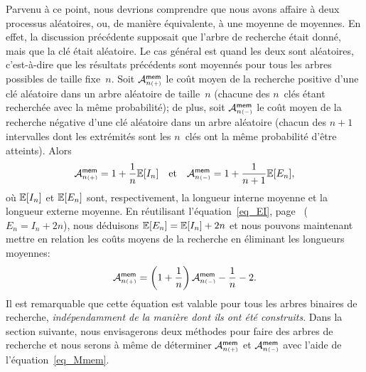Parvenu à ce point, nous devrions comprendre que nous avons affaire à
deux processus aléatoires, ou, de manière équivalente, à une moyenne
de moyennes. En effet, la discussion précédente supposait que l'arbre
de recherche était donné, mais que la clé était aléatoire. Le cas
général est quand les deux sont aléatoires, c'est-à-dire que les
résultats précédents sont moyennés pour tous les arbres possibles de
taille fixe~\(n\). Soit \(\M{\fun{mem}}{n{\scriptscriptstyle (+)}}\)
 le coût moyen
de la recherche positive d'une clé aléatoire dans un arbre aléatoire de
taille~\(n\) (chacune des \(n\)~clés étant recherchée avec la même
probabilité); de plus, soit \(\M{\fun{mem}}{n{\scriptscriptstyle
    (-)}}\) le
coût moyen de la recherche négative d'une clé aléatoire dans un arbre
aléatoire (chacun des \(n+1\) intervalles dont les extrémités sont les
\(n\)~clés ont la même probabilité d'être atteints). Alors
\begin{equation}
  \M{\fun{mem}}{n{\scriptscriptstyle (+)}}
  = 1 + \frac{1}{n}\Expected{I_n}
\quad\text{et}\quad
\M{\fun{mem}}{n{\scriptscriptstyle (-)}}
  = 1 + \frac{1}{n+1}\Expected{E_n},
\label{eq_Mmems}
\end{equation}
où \(\Expected{I_n}\) et \(\Expected{E_n}\) sont, respectivement, la
longueur interne moyenne
et la longueur externe moyenne. En réutilisant l'équation~\eqref{eq_EI},
page~\pageref{eq_EI} (\(E_n = I_n + 2n\)), nous déduisons
\(\Expected{E_n} = \Expected{I_n} + 2n\) et nous pouvons maintenant
mettre en relation les coûts moyens de la recherche en éliminant les
longueurs moyennes:
\begin{equation}
\M{\fun{mem}}{n{\scriptscriptstyle (+)}} = \left(1 + \frac{1}{n}\right)
\M{\fun{mem}}{n{\scriptscriptstyle (-)}} - \frac{1}{n} - 2.
\label{eq_Mmem}
\end{equation}
Il est remarquable que cette équation est valable pour tous les arbres
binaires de recherche, \emph{indépendamment de la manière dont ils ont
  été construits}. Dans la section suivante, nous envisagerons deux
méthodes pour faire des arbres de recherche et nous serons à même de
déterminer \(\M{\fun{mem}}{n{\scriptscriptstyle (+)}}\)
 et
\(\M{\fun{mem}}{n{\scriptscriptstyle (-)}}\)
 avec l'aide de
l'équation~\eqref{eq_Mmem}.

